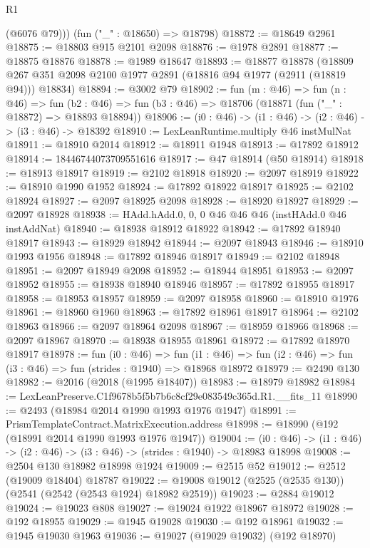 \begin{lexlean}{R1}
\begin{coremodule}
        (@6076 @79)))
    (fun ("_" : @18650) => @18798)
@18872 := @18649 @2961
@18875 := @18803 @915 @2101 @2098
@18876 := @1978 @2891
@18877 := @18875 @18876
@18878 := @1989 @18647
@18893 := @18877
    @18878
    (@18809 @267 @351 @2098 @2100 @1977 @2891 (@18816 @94 @1977 (@2911 (@18819 @94))) @18834)
@18894 := @3002 @79
@18902 := fun (m : @46) =>
  fun (n : @46) =>
  fun (b2 : @46) => fun (b3 : @46) => @18706 (@18871 (fun ("_" : @18872) => @18893 @18894))
@18906 := (i0 : @46) -> (i1 : @46) -> (i2 : @46) -> (i3 : @46) -> @18392
@18910 := LexLeanRuntime.multiply @46 instMulNat
@18911 := @18910 @2014
@18912 := @18911 @1948
@18913 := @17892 @18912
@18914 := 18446744073709551616
@18917 := @47 @18914 (@50 @18914)
@18918 := @18913 @18917
@18919 := @2102 @18918
@18920 := @2097 @18919
@18922 := @18910 @1990 @1952
@18924 := @17892 @18922 @18917
@18925 := @2102 @18924
@18927 := @2097 @18925 @2098
@18928 := @18920 @18927
@18929 := @2097 @18928
@18938 := HAdd.hAdd.{0, 0, 0} @46 @46 @46 (instHAdd.{0} @46 instAddNat)
@18940 := @18938 @18912 @18922
@18942 := @17892 @18940 @18917
@18943 := @18929 @18942
@18944 := @2097 @18943
@18946 := @18910 @1993 @1956
@18948 := @17892 @18946 @18917
@18949 := @2102 @18948
@18951 := @2097 @18949 @2098
@18952 := @18944 @18951
@18953 := @2097 @18952
@18955 := @18938 @18940 @18946
@18957 := @17892 @18955 @18917
@18958 := @18953 @18957
@18959 := @2097 @18958
@18960 := @18910 @1976
@18961 := @18960 @1960
@18963 := @17892 @18961 @18917
@18964 := @2102 @18963
@18966 := @2097 @18964 @2098
@18967 := @18959 @18966
@18968 := @2097 @18967
@18970 := @18938 @18955 @18961
@18972 := @17892 @18970 @18917
@18978 := fun (i0 : @46) =>
  fun (i1 : @46) => fun (i2 : @46) => fun (i3 : @46) => fun (strides : @1940) => @18968 @18972
@18979 := @2490 @130
@18982 := @2016 (@2018 (@1995 @18407))
@18983 := @18979 @18982
@18984 := LexLeanPreserve.C1f9678b5f5b7b6c8cf29e083549c365d.R1.__fits_11
@18990 := @2493 (@18984 @2014 @1990 @1993 @1976 @1947)
@18991 := PrismTemplateContract.MatrixExecution.address
@18998 := @18990 (@192 (@18991 @2014 @1990 @1993 @1976 @1947))
@19004 := (i0 : @46) -> (i1 : @46) -> (i2 : @46) -> (i3 : @46) -> (strides : @1940) -> @18983 @18998
@19008 := @2504 @130 @18982 @18998 @1924
@19009 := @2515 @52
@19012 := @2512 (@19009 @18404) @18787
@19022 := @19008 @19012 (@2525 (@2535 @130)) (@2541 (@2542 (@2543 @1924) @18982 @2519))
@19023 := @2884 @19012
@19024 := @19023 @808
@19027 := @19024 @1922 @18967 @18972
@19028 := @192 @18955
@19029 := @1945 @19028
@19030 := @192 @18961
@19032 := @1945 @19030 @1963
@19036 := @19027 (@19029 @19032) (@192 @18970)

\end{coremodule}
\end{lexlean}
